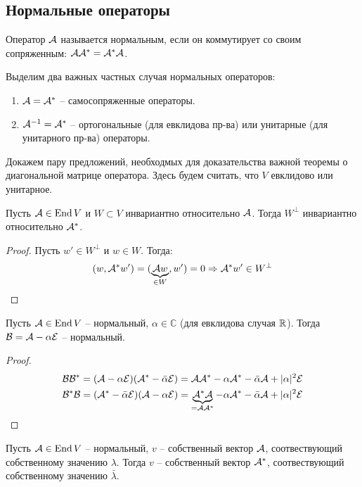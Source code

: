 \subsection{Нормальные операторы}

\begin{conj}
    Оператор $\mathcal{A}$ называется нормальным, если он коммутирует со своим сопряженным: $\mathcal{A}\mathcal{A}^* = \mathcal{A}^*\mathcal{A}$.
\end{conj}
Выделим два важных частных случая нормальных операторов:
\begin{enumerate}
    \item $\mathcal{A} = \mathcal{A}^*$ -- самосопряженные операторы.
    \item $\mathcal{A}^{-1} = \mathcal{A}^*$ -- ортогональные (для евклидова пр-ва) или унитарные (для унитарного пр-ва) операторы.
\end{enumerate}

Докажем пару предложений, необходмых для доказательства важной теоремы о диагональной матрице оператора.
Здесь будем считать, что $V$ евклидово или унитарное.

\begin{theorem-non}
    Пусть $\mathcal{A} \in \operatorname{End} V$ и $W \subset V$ инвариантно относительно $\mathcal{A}$. 
    Тогда $W^\perp$ инвариантно относительно $\mathcal{A}^*$.
\end{theorem-non}
\begin{proof}
    Пусть $w' \in W^\perp$ и $w \in W$. Тогда: \[ (w, \mathcal{A}^*w') = (\underbrace{\mathcal{A} w}_{\in W}, w') = 0 \Rightarrow \mathcal{A}^*w' \in W^\perp \]
\end{proof}

\begin{theorem-non}
    Пусть $\mathcal{A} \in \operatorname{End} V$ -- нормальный, $\alpha \in \mathbb{C}$ (для евклидова случая $\mathbb{R}$). Тогда $\mathcal{B} = \mathcal{A} - \alpha \mathcal{E}$ -- нормальный.
\end{theorem-non}

\begin{proof}
    \begin{gather*}
        \mathcal{B}\mathcal{B}^* = (\mathcal{A} - \alpha\mathcal{E})(\mathcal{A}^* - \bar{\alpha}\mathcal{E}) = \mathcal{A}\mathcal{A}^* - \alpha\mathcal{A}^* - \bar{\alpha}\mathcal{A} + |\alpha|^2\mathcal{E} \\
        \mathcal{B}^*\mathcal{B} = (\mathcal{A}^* - \bar{\alpha}\mathcal{E})(\mathcal{A} - \alpha\mathcal{E}) = \underbrace{\mathcal{A}^*\mathcal{A}}_{= \mathcal{A}\mathcal{A}^*} - \alpha\mathcal{A}^* - \bar{\alpha}\mathcal{A} + |\alpha|^2\mathcal{E} \\
    \end{gather*}
\end{proof}

\begin{theorem-non}
    Пусть $\mathcal{A} \in \operatorname{End} V$ -- нормальный, $v$ -- собственный вектор $\mathcal{A}$, соотвествующий собственному значению $\lambda$.
    Тогда $v$ -- собственный вектор $\mathcal{A}^*$, соотвествующий собственному значению $\bar{\lambda}$.
\end{theorem-non}

